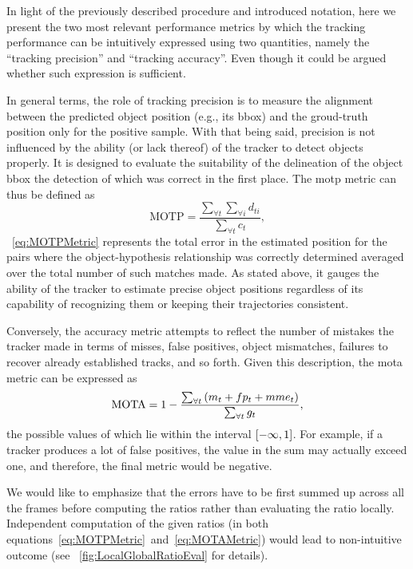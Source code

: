 In light of the previously described procedure and introduced notation, here we present the two most relevant performance metrics by which the tracking performance can be intuitively expressed using two quantities, namely the ``tracking precision'' and ``tracking accuracy''. Even though it could be argued whether such expression is sufficient.

In general terms, the role of tracking precision is to measure the alignment between the predicted object position (e.g., its \gls{bbox}) and the groud-truth position only for the positive sample. With that being said, precision is not influenced by the ability (or lack thereof) of the tracker to detect objects properly. It is designed to evaluate the suitability of the delineation of the object \gls{bbox} the detection of which was correct in the first place. The \gls{motp} metric can thus be defined as
\begin{equation}
    \label{eq:MOTPMetric}
    \text{MOTP} = \frac{\sum_{\forall t} \sum_{\forall i} d_{ti}}{\sum_{\forall t} c_t},
\end{equation}
\eqstr{}~\ref{eq:MOTPMetric} represents the total error in the estimated position for the pairs where the object-hypothesis relationship was correctly determined averaged over the total number of such matches made. As stated above, it gauges the ability of the tracker to estimate precise object positions regardless of its capability of recognizing them or keeping their trajectories consistent.

Conversely, the accuracy metric attempts to reflect the number of mistakes the tracker made in terms of misses, false positives, object mismatches, failures to recover already established tracks, and so forth. Given this description, the \gls{mota} metric can be expressed as
\begin{equation}
    \label{eq:MOTAMetric}
    \text{MOTA} = 1 - \frac{\sum_{\forall t} \left( {m_t + fp_t + mme_t} \right)}{\sum_{\forall t} g_t},
\end{equation}
the possible values of which lie within the interval $\left[ {-\infty, 1} \right]$. For example, if a tracker produces a lot of false positives, the value in the sum may actually exceed one, and therefore, the final metric would be negative.

We would like to emphasize that the errors have to be first summed up across all the frames before computing the ratios rather than evaluating the ratio locally. Independent computation of the given ratios (in both equations~\ref{eq:MOTPMetric}~and~\ref{eq:MOTAMetric}) would lead to non-intuitive outcome (see \figstr{}~\ref{fig:LocalGlobalRatioEval} for details).

